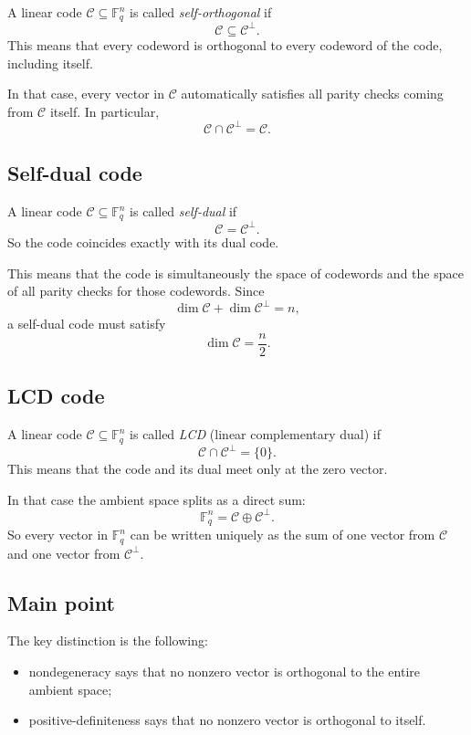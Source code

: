 \documentclass[11pt]{article}
\theoremstyle{remark}
\newcommand{\F}{\mathbb{F}}
\begin{document}
	A linear code \(\mathcal C\subseteq \F_q^n\) is called \emph{self-orthogonal} if
	\[
	\mathcal C\subseteq \mathcal C^\perp.
	\]
	This means that every codeword is orthogonal to every codeword of the code, including itself.
	
	In that case, every vector in \(\mathcal C\) automatically satisfies all parity checks coming from \(\mathcal C\) itself. In particular,
	\[
	\mathcal C\cap \mathcal C^\perp=\mathcal C.
	\]
	
	\subsection*{Self-dual code}
	
	A linear code \(\mathcal C\subseteq \F_q^n\) is called \emph{self-dual} if
	\[
	\mathcal C=\mathcal C^\perp.
	\]
	So the code coincides exactly with its dual code.
	
	This means that the code is simultaneously the space of codewords and the space of all parity checks for those codewords. Since
	\[
	\dim \mathcal C+\dim \mathcal C^\perp=n,
	\]
	a self-dual code must satisfy
	\[
	\dim \mathcal C=\frac n2.
	\]
	
	\subsection*{LCD code}
	
	A linear code \(\mathcal C\subseteq \F_q^n\) is called \emph{LCD} (linear complementary dual) if
	\[
	\mathcal C\cap \mathcal C^\perp=\{0\}.
	\]
	This means that the code and its dual meet only at the zero vector.
	
	In that case the ambient space splits as a direct sum:
	\[
	\F_q^n=\mathcal C\oplus \mathcal C^\perp.
	\]
	So every vector in \(\F_q^n\) can be written uniquely as the sum of one vector from \(\mathcal C\) and one vector from \(\mathcal C^\perp\).
	
	\subsection*{Main point}
	
	The key distinction is the following:
	
	\begin{itemize}
		\item nondegeneracy says that no nonzero vector is orthogonal to the entire ambient space;
		\item positive-definiteness says that no nonzero vector is orthogonal to itself.
	\end{itemize}
	
\end{document}
